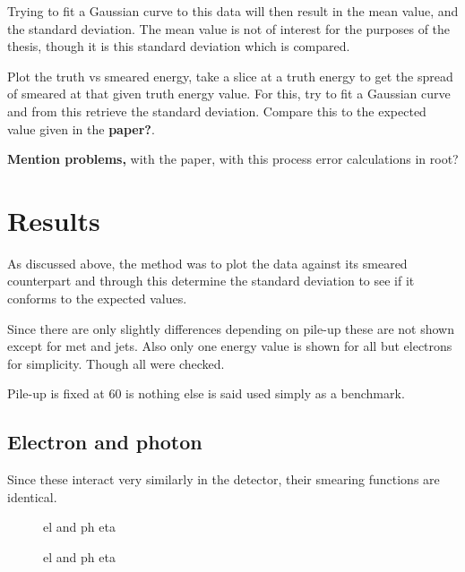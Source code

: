 Trying to fit a Gaussian curve to this data will then result in the mean value, and the standard deviation. The mean value is not of interest for the purposes of the thesis, though it is this standard deviation which is compared. 

Plot the truth vs smeared energy, take a slice at a truth energy to get the spread of smeared at that given truth energy value. For this, try to fit a Gaussian curve and from this retrieve the standard deviation. Compare this to the expected value given in the \textbf{paper?}.

\textbf{Mention problems,} with the paper, with this process error calculations in root?

\section{Results}\label{cha:vali:sec:results}
As discussed above, the method was to plot the data against its smeared counterpart and through this determine the standard deviation to see if it conforms to the expected values.

Since there are only slightly differences depending on pile-up these are not shown except for met and jets. Also only one energy value is shown for all but electrons for simplicity. Though all were checked.

Pile-up is fixed at 60 is nothing else is said used simply as a benchmark.
\subsection{Electron and photon}
Since these interact very  similarly in the detector, their smearing functions are identical.
\begin{figure}[!htbp]
  \centering 
\hfill
  \caption{el and ph eta}
  \label{fig:elph}
\end{figure}

\begin{figure}[!htbp]
  \ContinuedFloat 
  \centering 
  \hfill
  \setcounter{figure}{1}
  \caption[]{el and ph eta}
  \label{fig:elph}
\end{figure} 
\setcounter{figure}{1}

